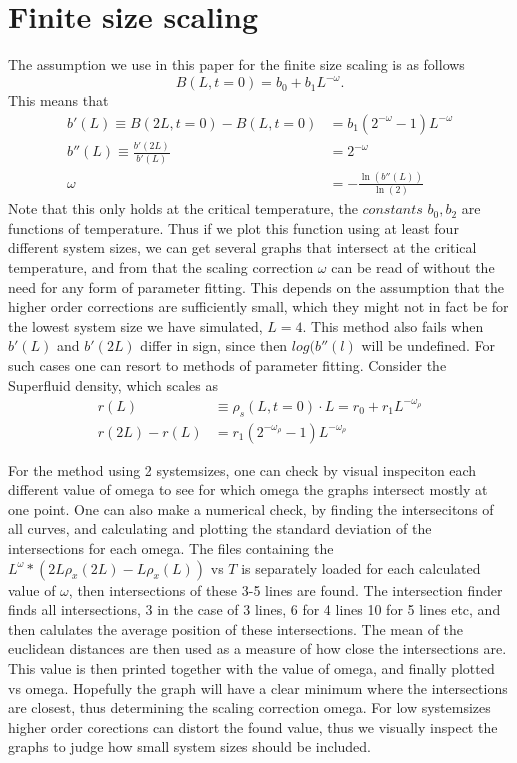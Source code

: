 \documentclass[a4paper]{article}
\begin{document}
\section{Finite size scaling}
The assumption we use in this paper for the finite size scaling is as follows
\begin{equation}
  B(L,t=0) = b_0 + b_1L^{-\omega}.
\end{equation}
This means that
\begin{align}
  b'(L) \equiv B(2L,t=0) - B(L,t=0) &= b_1(2^{-\omega} -1)L^{-\omega}\\
  b''(L)\equiv \frac{b'(2L)}{b'(L)} &= 2^{-\omega}\\
  \omega &= -\frac{\ln(b''(L))}{\ln(2)}
\end{align}
Note that this only holds at the critical temperature, the $\textit{constants}$ $b_0, b_2$ are functions of temperature. Thus if we plot this function using at least four different system sizes, we can get several graphs that intersect at the critical temperature, and from that the scaling correction $\omega$ can be read of without the need for any form of parameter fitting. This depends on the assumption that the higher order corrections are sufficiently small, which they might not in fact be for the lowest system size we have simulated, $L=4$. This method also fails when $b'(L)$ and $b'(2L)$ differ in sign, since then $log(b''(l)$ will be undefined.
For such cases one can resort to methods of parameter fitting.
Consider the Superfluid density, which scales as 
\begin{align}
  r(L)&\equiv \rho_s(L,t=0) \cdot L = r_0 + r_1L^{-\omega_\rho}\\
  r(2L) - r(L) &= r_1(2^{-\omega_\rho} -1)L^{-\omega_\rho}
  \label{}
\end{align}


For the method using 2 systemsizes, one can check by visual inspeciton each different value of omega to see for which omega the graphs intersect mostly at one point. One can also make a numerical check, by finding the intersecitons of all curves, and calculating  and plotting the standard deviation of the intersections for each omega.
The files containing the $L^{\omega}*(2L\rho_x(2L) - L\rho_x(L))$ vs $T$ is separately loaded for each calculated value of $\omega$, then intersections of these 3-5 lines are found. 
The intersection finder finds all intersections, 3 in the case of 3 lines, 6 for 4 lines 10 for 5 lines etc, and then calulates the average position of these intersections. The mean of the euclidean distances are then used as a measure of how close the intersections are. This value is then printed together with the value of omega, and finally plotted vs omega.
Hopefully the graph will have a clear minimum where the intersections are closest, thus determining the scaling correction omega. For low systemsizes higher order corections can distort the found value, thus we visually inspect the graphs to judge how small system sizes should be included. 
\end{document}
